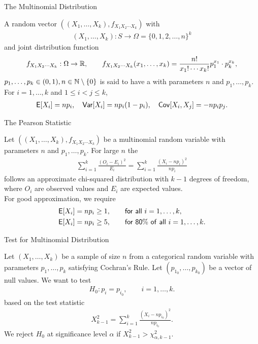 \begin{frame}{The Multinomial Distribution}

\justifying
{} A random vector $((X_1, \ldots, X_k), f_{X_1X_2\cdots X_k})$ with 
\begin{align*}
(X_1, \ldots, X_k): S\rightarrow \Omega = \{0, 1, 2, \ldots, n\}^k
\end{align*}
and joint distribution function 
\begin{align*}
f_{X_1X_2\cdots X_k}: \Omega\rightarrow\mathbb{R}, \qquad f_{X_1X_2\cdots X_k}(x_1, \ldots, x_k) = \frac{n!}{x_1!\cdots x_k!} p_1^{x_1}\cdot p_k^{x_k},
\end{align*}
$p_1,\ldots, p_k\in (0, 1), n\in \mathbb{N}\setminus\{0\}$ is said to have a  with parameters $n$ and $p_1,\ldots, p_k$. For $i = 1,\ldots, k$ and $1\leq i < j\leq k$,
\begin{align*}
\mathsf{E}[X_i] = np_i, \quad \mathsf{Var}[X_i] = np_i(1-p_i), \quad \mathsf{Cov}[X_i, X_j] = -np_ip_j.
\end{align*}

\end{frame}

\begin{frame}{The Pearson Statistic}

\justifying
{} Let $((X_1, \ldots, X_k), f_{X_1X_2\cdots X_k})$ be a multinomial random variable with parameters $n$ and $p_1, \ldots, p_k$. For large $n$ the 
\begin{align*}
\sum_{i=1}^k \frac{(O_i-E_i)^2}{E_i} = \sum_{i=1}^k \frac{(X_i-np_i)^2}{np_i}
\end{align*}
follows an approximate chi-squared distribution with $k-1$ degrees of freedom, where $O_i$ are observed values and $E_i$ are expected values. \\
 For good approximation, we require
\begin{align*}
\mathsf{E}[X_i] & = np_i \geq 1, \qquad \mathsf{for\ all\ } i = 1, \ldots, k,\\
\mathsf{E}[X_i] & = np_i \geq 5, \qquad \mathsf{for\ 80\%\ of\ all\ } i = 1,\ldots, k.
\end{align*}

\end{frame}

\begin{frame}{Test for Multinomial Distribution}

\justifying
{} Let $(X_1, \ldots, X_k)$ be a sample of size $n$ from a categorical random variable with parameters $p_1, \ldots, p_k$ satisfying Cochran's Rule. Let $(p_{1_0}, \ldots, p_{k_0})$ be a vector of null values. We want to test
\begin{align*}
H_0: p_i = p_{i_0}, \qquad i = 1,\ldots, k.
\end{align*}
based on the test statistic
\begin{align*}
X_{k-1}^2 = \sum_{i=1}^k \frac{(X_i - np_{i_0})^2}{np_{i_0}}.
\end{align*}
We reject $H_0$ at significance level $\alpha$ if $X_{k-1}^2 > \chi_{\alpha,k-1}^2$.

\end{frame}


